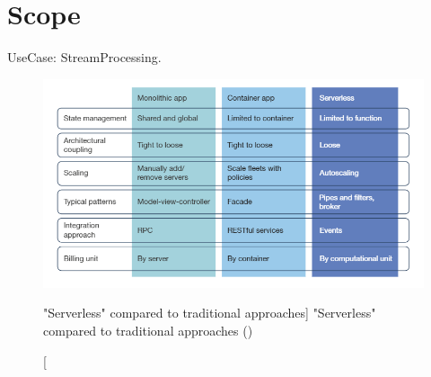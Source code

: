 \section{Scope}

UseCase: StreamProcessing.

\begin{figure}[ht]
    \includegraphics[width=\linewidth]{images/serverless/demyst.png}\centering
    \caption
    ["Serverless" compared to traditional approaches]
    {"Serverless" compared to traditional approaches (\cite{Hammond2018DemystifyingComputing})}
    \label{fig:slessCompared}
\end{figure}